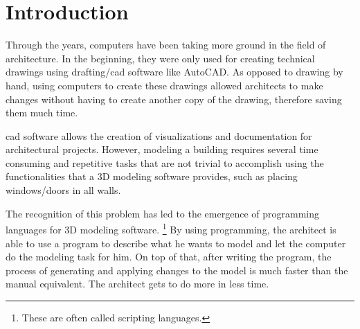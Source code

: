 
\section{Introduction}
\label{sec:introduction}



Through the years, computers have been taking more ground in the field of architecture.
In the beginning, they were only used for creating technical drawings using drafting/\gls{cad} software like AutoCAD.
As opposed to drawing by hand, using computers to create these drawings allowed architects to make changes without having to create another copy of the drawing, therefore saving them much time.


\gls{cad} software allows the creation of visualizations and documentation for architectural projects.
However, modeling a building requires several time consuming and repetitive tasks that are not trivial to accomplish using the functionalities that a 3D modeling software provides, such as placing windows/doors in all walls.


The recognition of this problem has led to the emergence of programming languages for 3D modeling software.%
\footnote{These are often called scripting languages.}
By using programming, the architect is able to use a program to describe what he wants to model and let the computer do the modeling task for him.
On top of that, after writing the program, the process of generating and applying changes to the model is much faster than the manual equivalent.
The architect gets to do more in less time.


